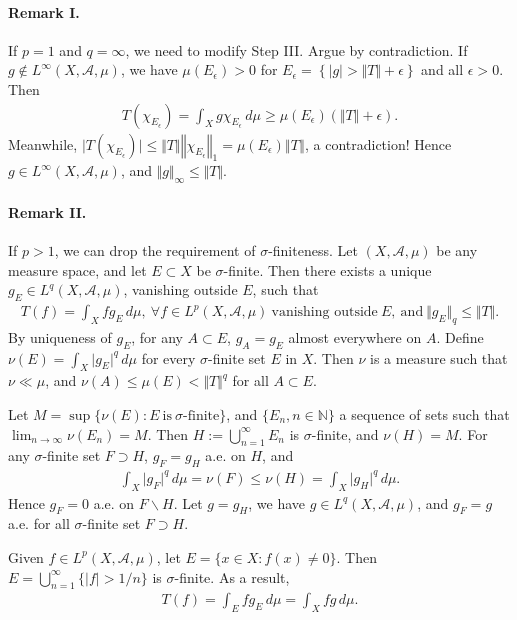 \documentclass{article}
\begin{document}
\paragraph{Remark I.} If $p=1$ and $q=\infty$, we need to modify Step III. Argue by contradiction. If $g\notin L^\infty(X,\mathscr{A},\mu)$, we have $\mu(E_\epsilon)>0$ for $E_\epsilon=\left\{\vert g\vert > \Vert T\Vert+\epsilon\right\}$ and all $\epsilon>0$. Then
\begin{align*}
	T(\chi_{E_\epsilon}) = \int_X g\chi_{E_\epsilon}\,d\mu \geq \mu(E_\epsilon)\left(\Vert T\Vert+\epsilon\right).
\end{align*}
Meanwhile, $\vert T(\chi_{E_\epsilon})\vert\leq\Vert T\Vert\left\Vert\chi_{E_\epsilon}\right\Vert_1 = \mu(E_\epsilon)\left\Vert T\right\Vert$, a contradiction! Hence $g\in L^\infty(X,\mathscr{A},\mu)$, and $\Vert g\Vert_\infty \leq \Vert T\Vert$.

\paragraph{Remark II.} If $p>1$, we can drop the requirement of $\sigma$-finiteness. Let $(X,\mathscr{A},\mu)$ be any measure space, and let $E\subset X$ be $\sigma$-finite. Then there exists a unique $g_E\in L^q(X,\mathscr{A},\mu)$, vanishing outside $E$, such that 
\begin{align*}
	T(f) = \int_X fg_E\,d\mu,\ \forall f\in L^p(X,\mathscr{A},\mu)\ \text{vanishing outside}\ E,\ \text{and}\ \Vert g_E\Vert_q\leq\Vert T\Vert.
\end{align*}
By uniqueness of $g_E$, for any $A\subset E$, $g_A=g_E$ almost everywhere on $A$. Define $\nu(E)=\int_X\vert g_E\vert^q\,d\mu$ for every $\sigma$-finite set $E$ in $X$. Then $\nu$ is a measure such that $\nu\ll\mu$, and $\nu(A)\leq\mu(E)<\Vert T\Vert^q$ for all $A\subset E$.

Let $M=\sup\{\nu(E):E\ \text{is}\ \sigma\text{-finite}\}$, and $\{E_n,n\in\mathbb{N}\}$ a sequence of sets such that $\lim_{n\to\infty}\nu(E_n) = M$. Then $H:=\bigcup_{n=1}^\infty E_n$ is $\sigma$-finite, and $\nu(H)=M$. For any $\sigma$-finite set $F\supset H$, $g_F=g_H$ a.e. on $H$, and
\begin{align*}
	\int_X\vert g_F\vert^q\,d\mu = \nu(F) \leq \nu(H) = \int_X\vert g_H\vert^q\,d\mu.
\end{align*}
Hence $g_F=0$ a.e. on $F\backslash H$. Let $g=g_H$, we have $g\in L^q(X,\mathscr{A},\mu)$, and $g_F=g$ a.e. for all $\sigma$-finite set $F\supset H$.

Given $f\in L^p(X,\mathscr{A},\mu)$, let $E=\{x\in X:f(x)\neq 0\}$. Then $E=\bigcup_{n=1}^\infty\{\vert f\vert > 1/n\}$ is $\sigma$-finite. As a result,
\begin{align*}
	T(f) = \int_E fg_E\,d\mu = \int_X fg\,d\mu.
\end{align*}
\end{document}
